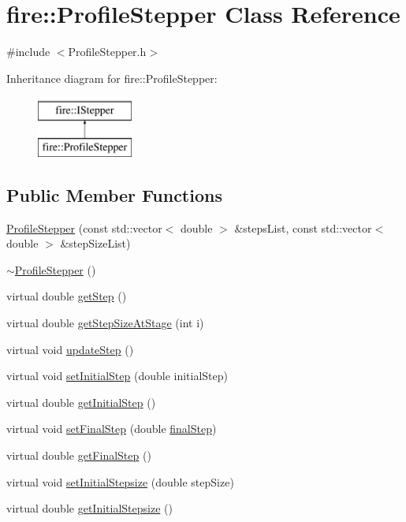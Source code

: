 \hypertarget{a00031}{}\section{fire\+:\+:Profile\+Stepper Class Reference}
\label{a00031}


{\ttfamily \#include $<$Profile\+Stepper.\+h$>$}

Inheritance diagram for fire\+:\+:Profile\+Stepper\+:\begin{figure}[H]
\begin{center}
\leavevmode
\includegraphics[height=2.000000cm]{a00031}
\end{center}
\end{figure}
\subsection*{Public Member Functions}
\begin{DoxyCompactItemize}
\item 
\hyperlink{a00031_a5bba5babbcb293b5e6a535cc4d06c55f}{Profile\+Stepper} (const std\+::vector$<$ double $>$ \&steps\+List, const std\+::vector$<$ double $>$ \&step\+Size\+List)
\item 
\hyperlink{a00031_a6838143d952dec2519a43c576a1f1546}{$\sim$\+Profile\+Stepper} ()
\item 
virtual double \hyperlink{a00031_a9096ad65a3fcf63678b600cbe0c33961}{get\+Step} ()
\item 
virtual double \hyperlink{a00031_adaa1a23c068977ecc6809dd8eecab49d}{get\+Step\+Size\+At\+Stage} (int i)
\item 
virtual void \hyperlink{a00031_a2c13fd4da5550f1e58df2b54bbfe4c2c}{update\+Step} ()
\item 
virtual void \hyperlink{a00031_adf2f78648d9539282225117c0fd243af}{set\+Initial\+Step} (double initial\+Step)
\item 
virtual double \hyperlink{a00031_af24660fa4bd027f877d5c1bdeb286cf5}{get\+Initial\+Step} ()
\item 
virtual void \hyperlink{a00031_af8203296b4f3bef53bafab7cb654cc97}{set\+Final\+Step} (double \hyperlink{a00031_a4f2347f039417fe9cdd16d3ca74a072d}{final\+Step})
\item 
virtual double \hyperlink{a00031_ae6f257aca7b3bb62a851169a01bcaacf}{get\+Final\+Step} ()
\item 
virtual void \hyperlink{a00031_a55c44fd97d8b6a474243ad0da48b039d}{set\+Initial\+Stepsize} (double step\+Size)
\item 
virtual double \hyperlink{a00031_a86e7035366907a08a36722655746271e}{get\+Initial\+Stepsize} ()
\end{DoxyCompactItemize}
